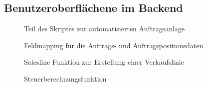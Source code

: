 \subsection{Benutzeroberflächene im Backend}
\label{app:Entwuerfe}
    \begin{figure}[htb]
        \centering
        \caption{Teil des Skriptes zur automatisierten Auftragsanlage}
    \end{figure}

    \begin{figure}[htb]
        \centering
        \caption{Feldmapping für die Auftrags- und Auftragspositionsdaten}
    \end{figure}

    \begin{figure}[htb]
        \centering
        \caption{Salesline Funktion zur Erstellung einer Verkaufslinie}
    \end{figure}
        
    \begin{figure}[htb]
        \centering
        \caption{Steuerberechnungsfunktion}
    \end{figure}
    \clearpage